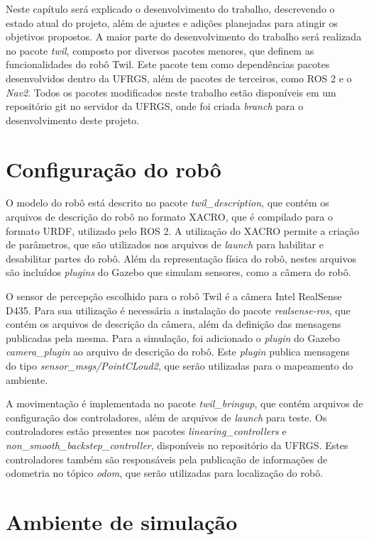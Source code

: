\documentclass[repeatfields,xlists,xpacks,oneside,yearsonly]{ufrgscca}
\begin{document}
Neste capítulo será explicado o desenvolvimento do trabalho, descrevendo o
estado atual do projeto, além de ajustes e adições planejadas para atingir
os objetivos propostos.
A maior parte do desenvolvimento do trabalho será realizada no pacote \textit{twil},
composto por diversos pacotes menores, que definem as funcionalidades do robô Twil.
Este pacote tem como dependências pacotes desenvolvidos dentro da UFRGS, além de pacotes de terceiros, como
ROS 2 e o \textit{Nav2}.
Todos os pacotes modificados neste trabalho estão disponíveis em um repositório git
no servidor da UFRGS, onde foi criada \textit{branch} para o desenvolvimento
deste projeto.

\section{Configuração do robô}

O modelo do robô está descrito no pacote \textit{twil\_description}, que contém
os arquivos de descrição do robô no formato XACRO, que é compilado para o formato
URDF, utilizado pelo ROS 2.
A utilização do XACRO permite a criação de parâmetros, que são utilizados nos
arquivos de \textit{launch} para habilitar e desabilitar partes do robô.
Além da representação física do robô, nestes arquivos são incluídos \textit{plugins}
do Gazebo que simulam sensores, como a câmera do robô.

O sensor de percepção escolhido para o robô Twil é a câmera Intel RealSense D435.
Para sua utilização é necessária a instalação do pacote
\textit{realsense-ros}\cite{realsense_ros}, que contém os arquivos de
descrição da câmera, além da definição das mensagens publicadas pela mesma.
Para a simulação, foi adicionado o \textit{plugin} do Gazebo
\textit{camera\_plugin} ao arquivo de descrição do robô.
Este \textit{plugin} publica mensagens do tipo \textit{sensor\_msgs/PointCLoud2}, que
serão utilizadas para o mapeamento do ambiente.

A movimentação é implementada no pacote \textit{twil\_bringup},
que contém arquivos de configuração dos controladores, além de arquivos de
\textit{launch} para teste.
Os controladores estão presentes nos pacotes \textit{linearing\_controllers} e
\textit{non\_smooth\_backstep\_controller}, disponíveis no repositório da UFRGS.
Estes controladores também são responsáveis pela publicação de
informações de odometria no tópico \textit{odom}, que serão utilizadas para
localização do robô.

\section{Ambiente de simulação}
\end{document}

